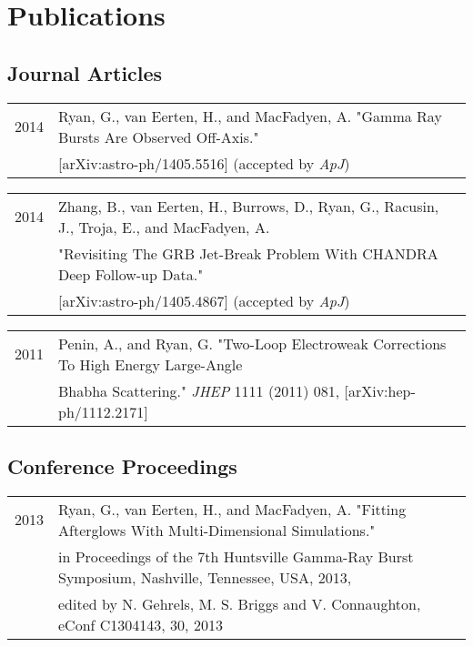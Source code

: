 \documentclass[letterpaper]{article}
\renewenvironment{itemize}{
  \begin{list}{}{
    \setlength{\leftmargin}{1.5em}
  }
}{
  \end{list}
}
\begin{document}
\section*{Publications}
\subsection*{Journal Articles}
\begin{itemize}
\item \begin{tabular}{ll}
2014 & Ryan, G., van Eerten, H., and MacFadyen, A. "Gamma Ray Bursts Are Observed Off-Axis."  \\
	& [arXiv:astro-ph/1405.5516] (accepted by \emph{ApJ}) \\
\end{tabular}

\item \begin{tabular}{ll}
2014 & Zhang, B., van Eerten, H., Burrows, D., Ryan, G., Racusin, J., Troja, E., and MacFadyen, A. \\
 & "Revisiting The GRB Jet-Break Problem With CHANDRA Deep Follow-up Data."  \\
& [arXiv:astro-ph/1405.4867] (accepted by \emph{ApJ}) \\
\end{tabular}

\item \begin{tabular}{ll}
2011 & Penin, A., and Ryan, G.  "Two-Loop Electroweak Corrections To High Energy Large-Angle \\& Bhabha Scattering." \emph{JHEP} 1111 (2011) 081, [arXiv:hep-ph/1112.2171] \\
\end{tabular}
\end{itemize}

\subsection*{Conference Proceedings}
\begin{itemize}
\item \begin{tabular}{ll}
2013 & Ryan, G., van Eerten, H., and MacFadyen, A. "Fitting Afterglows With Multi-Dimensional Simulations." \\& in Proceedings of the 7th Huntsville Gamma-Ray Burst Symposium, Nashville, Tennessee, USA, 2013, \\& edited by N. Gehrels, M. S. Briggs and V. Connaughton, eConf C1304143, 30, 2013 \\
\end{tabular}
\end{itemize}
\end{document}
